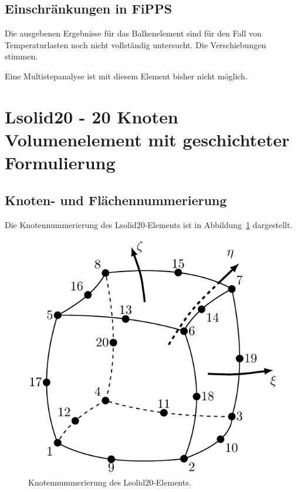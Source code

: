 \documentclass[11pt,titlepage,listof=totoc,bibliography=totoc,twoside]{scrreprt}
\begin{document}
\subsection{Einschränkungen in FiPPS}

Die ausgebenen Ergebnisse für das Balkenelement sind für den Fall von Temperaturlasten noch nicht vollständig untersucht. Die Verschiebungen stimmen.

Eine Multistepanalyse ist mit diesem Element bisher nicht möglich.

\newpage

\section{Lsolid20 - 20 Knoten Volumenelement mit geschichteter Formulierung}

\subsection{Knoten- und Flächennummerierung}

Die Knotennummerierung des Lsolid20-Elements ist in Abbildung~\ref{fig:lsolid20_knoten} dargestellt.

\begin{figure}[htb]
\centering
\begin{center}
\includegraphics[scale=0.4]{Bilder/lsolid20_knoten}
\end{center}
\caption{Knotennummerierung des Lsolid20-Elements.}
\label{fig:lsolid20_knoten}
\end{figure}
\end{document}
